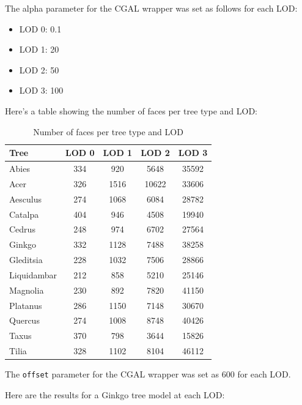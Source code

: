 \documentclass[12pt]{article}
\begin{document}
\newpage

The alpha parameter for the CGAL wrapper was set as follows for each LOD:

\begin{itemize}
    \item LOD 0: 0.1
    \item LOD 1: 20
    \item LOD 2: 50
    \item LOD 3: 100
\end{itemize}

Here's a table showing the number of faces per tree type and LOD:

\begin{table}[h]
    \centering
    \begin{tabular}{|l|c|c|c|c|}
    \hline
    Tree & LOD 0 & LOD 1 & LOD 2 & LOD 3 \\
    \hline
    Abies & 334 & 920 & 5648 & 35592 \\
    Acer & 326 & 1516 & 10622 & 33606 \\
    Aesculus & 274 & 1068 & 6084 & 28782 \\
    Catalpa & 404 & 946 & 4508 & 19940 \\
    Cedrus & 248 & 974 & 6702 & 27564 \\
    Ginkgo & 332 & 1128 & 7488 & 38258 \\
    Gleditsia & 228 & 1032 & 7506 & 28866 \\
    Liquidambar & 212 & 858 & 5210 & 25146 \\
    Magnolia & 230 & 892 & 7820 & 41150 \\
    Platanus & 286 & 1150 & 7148 & 30670 \\
    Quercus & 274 & 1008 & 8748 & 40426 \\
    Taxus & 370 & 798 & 3644 & 15826 \\
    Tilia & 328 & 1102 & 8104 & 46112 \\
    \hline
    \end{tabular}
    \caption{Number of faces per tree type and LOD}
    \label{tab:my_label}
\end{table}

The \texttt{offset} parameter for the CGAL wrapper was set as 600 for each LOD.

Here are the results for a Ginkgo tree model at each LOD:
\end{document}
